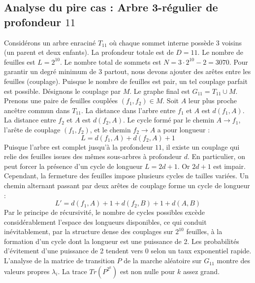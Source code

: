 \documentclass[11pt,a4paper]{article}
\begin{document}
\subsection{Analyse du pire cas : Arbre 3-régulier de profondeur $11$}
Considérons un arbre enraciné $T_{11}$ où chaque sommet interne possède 3 voisins (un parent et deux enfants).
La profondeur totale est de $D = 11$.
Le nombre de feuilles est $L = 2^{10}$.
Le nombre total de sommets est $N = 3 \cdot 2^{10} - 2 = 3070$.
Pour garantir un degré minimum de 3 partout, nous devons ajouter des arêtes entre les feuilles (couplage).
Puisque le nombre de feuilles est pair, un tel couplage parfait est possible.
Désignons le couplage par $M$. Le graphe final est $G_{11} = T_{11} \cup M$.
Prenons une paire de feuilles couplées $(f_1, f_2) \in M$.
Soit $A$ leur plus proche ancêtre commun dans $T_{11}$.
La distance dans l'arbre entre $f_1$ et $A$ est $d(f_1, A)$.
La distance entre $f_2$ et $A$ est $d(f_2, A)$.
Le cycle formé par le chemin $A \to f_1$, l'arête de couplage $(f_1, f_2)$, et le chemin $f_2 \to A$ a pour longueur :
$$ L = d(f_1, A) + d(f_2, A) + 1 $$
Puisque l'arbre est complet jusqu'à la profondeur $11$, il existe un couplage qui relie des feuilles issues des mêmes sous-arbres à profondeur $d$.
En particulier, on peut forcer la présence d'un cycle de longueur $L = 2d + 1$. Or $2d+1$ est impair.
Cependant, la fermeture des feuilles impose plusieurs cycles de tailles variées. Un chemin alternant passant par deux arêtes de couplage forme un cycle de longueur :
$$ L' = d(f_1, A) + 1 + d(f_2, B) + 1 + d(A, B) $$
Par le principe de récursivité, le nombre de cycles possibles excède considérablement l'espace des longueurs disponibles, ce qui conduit inévitablement, par la structure dense des couplages sur $2^{10}$ feuilles, à la formation d'un cycle dont la longueur est une puissance de 2. Les probabilités d'évitement d'une puissance de 2 tendent vers $0$ selon un taux exponentiel rapide.
L'analyse de la matrice de transition $P$ de la marche aléatoire sur $G_{11}$ montre des valeurs propres $\lambda_i$. La trace $Tr(P^{2^k})$ est non nulle pour $k$ assez grand.
\end{document}
